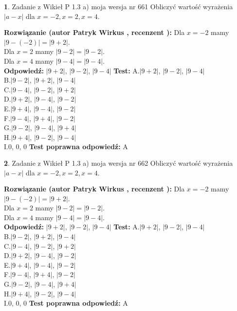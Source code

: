 \documentclass[12pt, a4paper]{article}
\theoremstyle{definition} %
\newtheorem{zad}{}
\newcommand{\zadStart}[1]{\begin{zad}#1\newline}
\newcommand{\zadStop}{\end{zad}}
\newcommand{\rozwStart}[2]{\noindent \textbf{Rozwiązanie (autor #1 , recenzent #2): }\newline}
\newcommand{\rozwStop}{\newline}
\newcommand{\odpStart}{\noindent \textbf{Odpowiedź:}\newline}
\newcommand{\odpStop}{\newline}
\newcommand{\testStart}{\noindent \textbf{Test:}\newline}
\newcommand{\testStop}{\newline}
\newcommand{\kluczStart}{\noindent \textbf{Test poprawna odpowiedź:}\newline}
\newcommand{\kluczStop}{\newline}
\begin{document}
\zadStart{Zadanie z Wikieł P 1.3 a) moja wersja nr 661}
Obliczyć wartość wyrażenia $|a - x|$ dla $x=-2,x=2,x=4$.
\zadStop
\rozwStart{Patryk Wirkus}{}
Dla $x = -2$ mamy $|9 - (-2)| = |9 + 2|$.\\
Dla $x = 2$ mamy $|9 - 2| = |9 - 2|$.\\
Dla $x = 4$ mamy $|9 - 4| = |9 - 4|$.\\
\rozwStop
\odpStart
$|9 + 2|$, $|9 - 2|$, $|9 - 4|$
\odpStop
\testStart
A.$|9 + 2|$, $|9 - 2|$, $|9 - 4|$\\
B.$|9 - 2|$, $|9 + 2|$, $|9 - 4|$\\
C.$|9 - 4|$, $|9 - 2|$, $|9 + 2|$\\
D.$|9 + 2|$, $|9 - 4|$, $|9 - 2|$\\
E.$|9 + 4|$, $|9 - 4|$, $|9 - 2|$\\
F.$|9 - 4|$, $|9 + 4|$, $|9 - 2|$\\
G.$|9 - 2|$, $|9 - 4|$, $|9 + 4|$\\
H.$|9 + 4|$, $|9 - 2|$, $|9 - 4|$\\
I.$0$, $0$, $0$
\testStop
\kluczStart
A
\kluczStop



\zadStart{Zadanie z Wikieł P 1.3 a) moja wersja nr 662}
Obliczyć wartość wyrażenia $|a - x|$ dla $x=-2,x=2,x=4$.
\zadStop
\rozwStart{Patryk Wirkus}{}
Dla $x = -2$ mamy $|9 - (-2)| = |9 + 2|$.\\
Dla $x = 2$ mamy $|9 - 2| = |9 - 2|$.\\
Dla $x = 4$ mamy $|9 - 4| = |9 - 4|$.\\
\rozwStop
\odpStart
$|9 + 2|$, $|9 - 2|$, $|9 - 4|$
\odpStop
\testStart
A.$|9 + 2|$, $|9 - 2|$, $|9 - 4|$\\
B.$|9 - 2|$, $|9 + 2|$, $|9 - 4|$\\
C.$|9 - 4|$, $|9 - 2|$, $|9 + 2|$\\
D.$|9 + 2|$, $|9 - 4|$, $|9 - 2|$\\
E.$|9 + 4|$, $|9 - 4|$, $|9 - 2|$\\
F.$|9 - 4|$, $|9 + 4|$, $|9 - 2|$\\
G.$|9 - 2|$, $|9 - 4|$, $|9 + 4|$\\
H.$|9 + 4|$, $|9 - 2|$, $|9 - 4|$\\
I.$0$, $0$, $0$
\testStop
\kluczStart
A
\kluczStop
\end{document}
